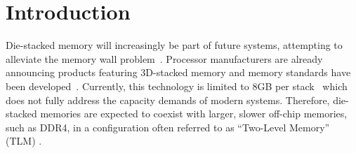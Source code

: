 \section{Introduction}
\label{sec:Introduction}
 


Die-stacked memory will increasingly be part of future systems, 
attempting to alleviate 
the memory wall problem~\cite{wulf-can95}. Processor manufacturers are 
already announcing products featuring 3D-stacked memory \cite{KnightsLanding,NVIDIA,black-micro2013}  and memory standards have been developed~\cite{jedec-wideio,JEDEC-HBM,pawlowski-hotchips2011}. 
Currently, this technology is limited to 8GB per stack~\cite{JEDEC-HBM-REVISED}
which does not fully address the capacity demands of modern systems. 
Therefore, die-stacked memories are expected to coexist with larger, 
slower off-chip memories, such as DDR4, in a configuration often
referred to as ``Two-Level Memory'' (TLM) \cite{cameo,meswani-HPCA21}.  

